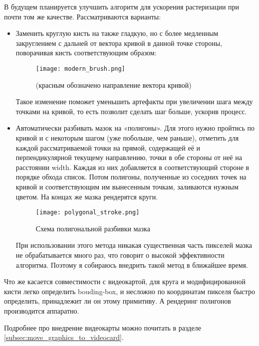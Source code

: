 В будущем планируется улучшить алгоритм для ускорения растеризации при почти том же качестве.
Рассматриваются варианты:
\begin{itemize}
    \item Заменить круглую кисть на также гладкую, но с более медленным закруглением с дальней от вектора кривой в данной точке стороны, поворачивая кисть соответствующим образом:
    \begin{figure}[h!]
        \centering
        \texttt{[image: modern\_brush.png]}
        \caption{(красным обозначено направление вектора кривой)}
        \label{fig:modern_brush}
    \end{figure}
    \FloatBarrier

    Такое изменение поможет уменьшить артефакты при увеличении шага между точками на кривой, то есть позволит сделать шаг больше, ускорив процесс.

    \item Автоматически разбивать мазок на «полигоны».
                Для этого нужно пройтись по кривой и с некоторым шагом (уже побольше, чем раньше),
                отметить для каждой рассматриваемой точки на прямой, содержащей её и перпендикулярной текущему направлению, точки в обе стороны от неё на расстоянии width.
                Каждая из них добавляется в соответствующий стороне в порядке обхода список.
                Потом полигоны, полученные из соседних точек на кривой и соответствующим им вынесенным точкам, заливаются нужным цветом.
                На концах же мазка рендерятся круги.

    \begin{figure}[h!]
        \centering
        \texttt{[image: polygonal\_stroke.png]}
        \caption{Схема полигональной разбивки мазка}
        \label{fig:polygonal_stroke}
    \end{figure}
    \FloatBarrier

    При использовании этого метода никакая существенная часть пикселей мазка не обрабатывается много раз, что говорит о высокой эффективности алгоритма.
    Поэтому я собираюсь внедрить такой метод в ближайшее время.
\end{itemize}

Что же касается совместимости с видеокартой,
для круга и модифицированной кисти легко определить bouding-box,
и несложно по координатам пикселя быстро определить, принадлежит ли он этому примитиву.
А рендеринг полигонов производится аппаратно.

Подробнее про внедрение видеокарты можно почитать в разделе \ref{subsec:move_graphics_to_videocard}.

